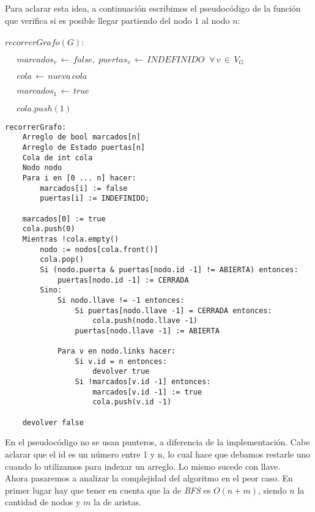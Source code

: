 Para aclarar esta idea, a continuación escribimos el pseudocódigo de la función que verifica si es posible llegar partiendo del nodo $1$ al nodo $n$: \\ \\
$recorrerGrafo(G):$

$\; \; \; \; \; marcados_v \, \longleftarrow \, false, \; puertas_v \, \longleftarrow \, INDEFINIDO \; \; \forall \, v \, \in \, V_G$

$\; \; \; \; \; cola \, \longleftarrow \, nueva \, cola$

$\; \; \; \; \; marcados_1 \, \longleftarrow \, true$

$\; \; \; \; \; cola.push(1)$

\begin{verbatim}
recorrerGrafo:  
    Arreglo de bool marcados[n]
    Arreglo de Estado puertas[n]
    Cola de int cola
    Nodo nodo
    Para i en [0 ... n] hacer:
        marcados[i] := false
        puertas[i] := INDEFINIDO;

    marcados[0] := true
    cola.push(0)
    Mientras !cola.empty()
        nodo := nodos[cola.front()]
        cola.pop()
        Si (nodo.puerta & puertas[nodo.id -1] != ABIERTA) entonces:
            puertas[nodo.id -1] := CERRADA
        Sino:
            Si nodo.llave != -1 entonces:
                Si puertas[nodo.llave -1] = CERRADA entonces:
                    cola.push(nodo.llave -1)
                puertas[nodo.llave -1] := ABIERTA
            
            Para v en nodo.links hacer:
                Si v.id = n entonces:
                	devolver true
                Si !marcados[v.id -1] entonces:
                    marcados[v.id -1] := true
                    cola.push(v.id -1)

    devolver false
\end{verbatim}

En el pseudocódigo no se usan punteros, a diferencia de la implementación. Cabe aclarar que el id es un número entre 1 y n, lo cual hace que debamos restarle uno cuando lo utilizamos para indexar un arreglo. Lo mismo sucede con llave. \\

Ahora pasaremos a analizar la complejidad del algoritmo en el peor caso. En primer lugar hay que tener en cuenta que la de \textit{BFS} es $O(n+m)$, siendo $n$ la cantidad de nodos y $m$ la de aristas. \\

